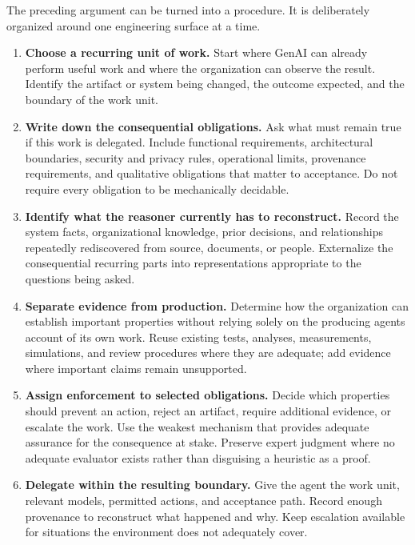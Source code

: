 

The preceding argument can be turned into a procedure. It is deliberately organized around one engineering surface at a time.

\begin{enumerate}
\def\labelenumi{\arabic{enumi}.}
\tightlist
\item
  \textbf{Choose a recurring unit of work.} Start where GenAI can already perform useful work and where the organization can observe the result. Identify the artifact or system being changed, the outcome expected, and the boundary of the work unit.
\item
  \textbf{Write down the consequential obligations.} Ask what must remain true if this work is delegated. Include functional requirements, architectural boundaries, security and privacy rules, operational limits, provenance requirements, and qualitative obligations that matter to acceptance. Do not require every obligation to be mechanically decidable.
\item
  \textbf{Identify what the reasoner currently has to reconstruct.} Record the system facts, organizational knowledge, prior decisions, and relationships repeatedly rediscovered from source, documents, or people. Externalize the consequential recurring parts into representations appropriate to the questions being asked.
\item
  \textbf{Separate evidence from production.} Determine how the organization can establish important properties without relying solely on the producing agent\textquotesingle s account of its own work. Reuse existing tests, analyses, measurements, simulations, and review procedures where they are adequate; add evidence where important claims remain unsupported.
\item
  \textbf{Assign enforcement to selected obligations.} Decide which properties should prevent an action, reject an artifact, require additional evidence, or escalate the work. Use the weakest mechanism that provides adequate assurance for the consequence at stake. Preserve expert judgment where no adequate evaluator exists rather than disguising a heuristic as a proof.
\item
  \textbf{Delegate within the resulting boundary.} Give the agent the work unit, relevant models, permitted actions, and acceptance path. Record enough provenance to reconstruct what happened and why. Keep escalation available for situations the environment does not adequately cover.

\end{enumerate}
